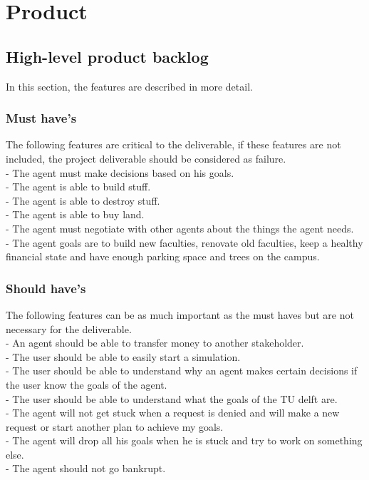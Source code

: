 \section{Product}
\subsection{High-level product backlog}
In this section, the features are described in more detail.

\subsubsection{Must have's}
The following features are critical to the deliverable, if these features are not included, the project deliverable should be considered as failure.\\
\indent	-        The agent must make decisions based on his goals.\\
\indent	-        The agent is able to build stuff.\\
\indent	-        The agent is able to destroy stuff.\\
\indent	-        The agent is able to buy land.\\
\indent	-        The agent must negotiate with other agents about the things the agent 
\indent		needs.\\
\indent	-        The agent goals are to build new faculties, renovate old faculties, keep 
\indent	a healthy financial state and have enough parking space and trees on the
\indent campus.

\subsubsection{Should have's}
The following features can be as much important as the must haves but are not necessary for the deliverable.\\
\indent-        An agent should be able to transfer money to another stakeholder.\\
\indent-        The user should be able to easily start a simulation.\\
\indent-        The user should be able to understand why an agent makes certain 
\indent		decisions if the user know the goals of the agent.\\
\indent-        The user should be able to understand what the goals of the TU delft 
\indent		are.\\
\indent-        The agent will not get stuck when a request is denied and will make a 
\indent	new request or start another plan to achieve my goals.\\
\indent-        The agent will drop all his goals when he is stuck and try to work on 
\indent	something else.\\
\indent -       The agent should not go bankrupt.


